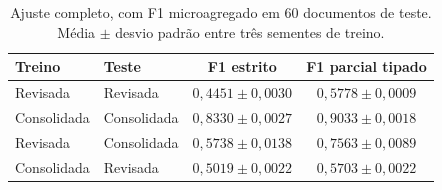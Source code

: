 \begin{table}[ht]
\centering
\caption{Ajuste completo, com F1 microagregado em 60 documentos de teste. Média $\pm$ desvio padrão entre três sementes de treino.}
\label{tab:finetuning}
\begin{tabular}{l|l|c|c}
\hline
\textbf{Treino} & \textbf{Teste} & \textbf{F1 estrito} & \textbf{F1 parcial tipado} \\
\hline
Revisada & Revisada & $0{,}4451 \pm 0{,}0030$ & $0{,}5778 \pm 0{,}0009$ \\
Consolidada & Consolidada & $0{,}8330 \pm 0{,}0027$ & $0{,}9033 \pm 0{,}0018$ \\
Revisada & Consolidada & $0{,}5738 \pm 0{,}0138$ & $0{,}7563 \pm 0{,}0089$ \\
Consolidada & Revisada & $0{,}5019 \pm 0{,}0022$ & $0{,}5703 \pm 0{,}0022$ \\
\hline
\end{tabular}
\end{table}
